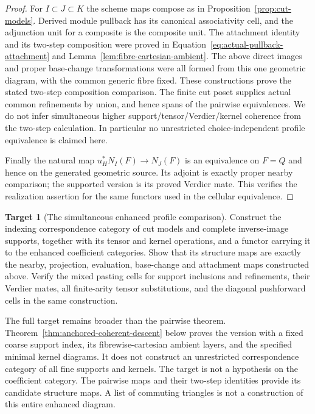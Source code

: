 \documentclass[11pt]{article}
\theoremstyle{definition}
\newtheorem{target}[theorem]{Target}
\theoremstyle{remark}
\begin{document}
\begin{proof}
For $I\subset J\subset K$ the scheme maps compose as in
Proposition~\ref{prop:cut-models}.  Derived module pullback has its
canonical associativity cell, and the adjunction unit for a composite
is the composite unit.  The attachment identity and its two-step composition were proved
in Equation~\eqref{eq:actual-pullback-attachment} and
Lemma~\ref{lem:fibre-cartesian-ambient}.  The above direct images and proper
base-change transformations were all formed from this one geometric
diagram, with the common generic fibre fixed.  These constructions
prove the stated two-step composition comparison.  The finite cut
poset supplies actual common refinements by union, and hence spans
of the pairwise equivalences.  We do not infer simultaneous higher
support/tensor/Verdier/kernel coherence from the two-step calculation.
In particular no unrestricted choice-independent profile equivalence
is claimed here.

Finally the natural map $u_H^*N_I(F)\to N_J(F)$ is an equivalence
on $F=Q$ and hence on the generated geometric source.  Its adjoint
is exactly proper nearby comparison; the supported version is its
proved Verdier mate.  This verifies the realization assertion for
the same functors used in the cellular equivalence.
\end{proof}

\begin{target}[The simultaneous enhanced profile comparison]
\label{target:enhanced-profile}
Construct the indexing correspondence category of cut models and
complete inverse-image supports, together with its tensor and kernel
operations, and a functor carrying it to the enhanced coefficient
categories.  Show that its structure maps are exactly the nearby,
projection, evaluation, base-change and attachment maps constructed
above.  Verify the mixed pasting cells for support inclusions and
refinements, their Verdier mates, all finite-arity tensor substitutions,
and the diagonal pushforward cells in the same construction.
\end{target}
The full target remains broader than the pairwise theorem.
Theorem~\ref{thm:anchored-coherent-descent} below proves the version with
a fixed coarse support index, its fibrewise-cartesian ambient layers,
and the specified minimal kernel diagrams.  It does not construct
an unrestricted correspondence category of all fine supports and kernels.
The target is not a hypothesis on the coefficient category.
The pairwise maps and their two-step identities provide its candidate
structure maps.  A list of commuting triangles is not a construction
of this entire enhanced diagram.
\end{document}
